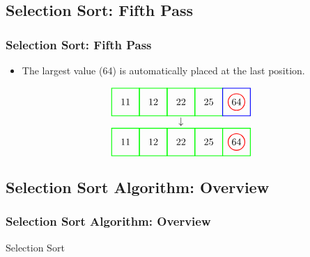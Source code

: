 \documentclass{beamer}
\begin{document}
\subsection{Selection Sort: Fifth Pass}
\begin{frame}[c, fragile]
\frametitle{Selection Sort: Fifth Pass}

\begin{itemize}
    \item The largest value (64) is automatically placed at the last position.
\end{itemize}

\[
\begin{array}{c}
\begin{tikzpicture}[baseline=(current bounding box.center)]
    \node at (0,0) {11};
    \node at (1,0) {12};
    \node at (2,0) {22};
    \node at (3,0) {25};
    \node at (4,0) {64};
    \draw[red, thick] (4,0) circle (0.3);
    \draw[green, thick] (-0.5,-0.5) rectangle (0.5,0.5);
    \draw[green, thick] (0.5,-0.5) rectangle (1.5,0.5);
    \draw[green, thick] (1.5,-0.5) rectangle (2.5,0.5);
    \draw[green, thick] (2.5,-0.5) rectangle (3.5,0.5);
    \draw[blue, thick] (3.5,-0.5) rectangle (4.5,0.5);
\end{tikzpicture} \\
\downarrow \\
\begin{tikzpicture}[baseline=(current bounding box.center)]
    \node at (0,0) {11};
    \node at (1,0) {12};
    \node at (2,0) {22};
    \node at (3,0) {25};
    \node at (4,0) {64};
    \draw[red, thick] (4,0) circle (0.3);
    \draw[green, thick] (-0.5,-0.5) rectangle (0.5,0.5);
    \draw[green, thick] (0.5,-0.5) rectangle (1.5,0.5);
    \draw[green, thick] (1.5,-0.5) rectangle (2.5,0.5);
    \draw[green, thick] (2.5,-0.5) rectangle (3.5,0.5);
    \draw[green, thick] (3.5,-0.5) rectangle (4.5,0.5);
\end{tikzpicture}
\end{array}
\]

\end{frame}

\subsection{Selection Sort Algorithm: Overview}
\begin{frame}[fragile]
\frametitle{Selection Sort Algorithm: Overview}


\begin{algorithm}[H]
\caption{Selection Sort}
\label{algo:selectionsort}

\end{algorithm}

\end{frame}
\end{document}
